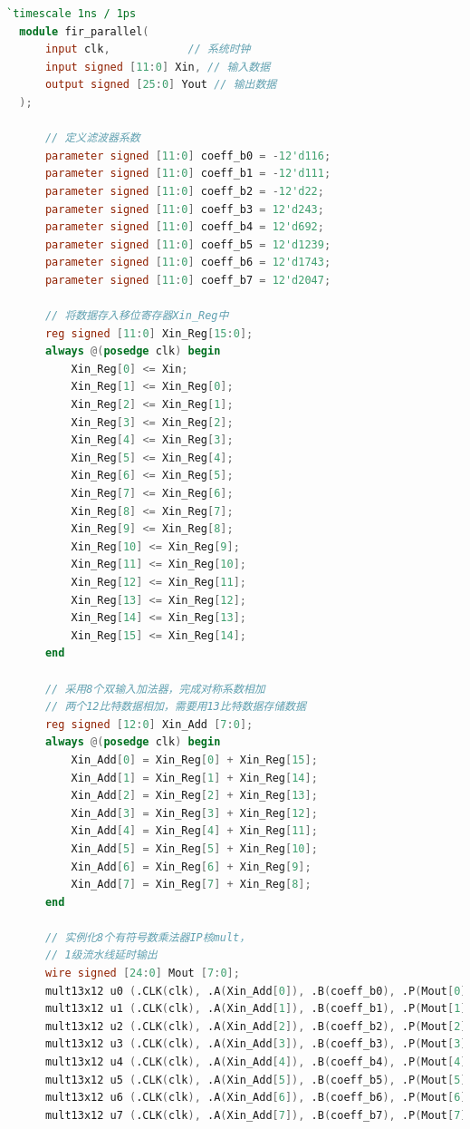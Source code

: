 \begin{remark}
\end{remark}
\begin{lstlisting}[language=verilog,caption={FIR滤波器模块}]
  `timescale 1ns / 1ps
  module fir_parallel( 
      input clk,            // 系统时钟
      input signed [11:0] Xin, // 输入数据
      output signed [25:0] Yout // 输出数据
  );
  
      // 定义滤波器系数
      parameter signed [11:0] coeff_b0 = -12'd116;
      parameter signed [11:0] coeff_b1 = -12'd111;
      parameter signed [11:0] coeff_b2 = -12'd22;
      parameter signed [11:0] coeff_b3 = 12'd243;
      parameter signed [11:0] coeff_b4 = 12'd692;
      parameter signed [11:0] coeff_b5 = 12'd1239;
      parameter signed [11:0] coeff_b6 = 12'd1743;
      parameter signed [11:0] coeff_b7 = 12'd2047;
  
      // 将数据存入移位寄存器Xin_Reg中
      reg signed [11:0] Xin_Reg[15:0];
      always @(posedge clk) begin
          Xin_Reg[0] <= Xin;
          Xin_Reg[1] <= Xin_Reg[0];
          Xin_Reg[2] <= Xin_Reg[1];
          Xin_Reg[3] <= Xin_Reg[2];
          Xin_Reg[4] <= Xin_Reg[3];
          Xin_Reg[5] <= Xin_Reg[4];
          Xin_Reg[6] <= Xin_Reg[5];
          Xin_Reg[7] <= Xin_Reg[6];
          Xin_Reg[8] <= Xin_Reg[7];
          Xin_Reg[9] <= Xin_Reg[8];
          Xin_Reg[10] <= Xin_Reg[9];
          Xin_Reg[11] <= Xin_Reg[10];
          Xin_Reg[12] <= Xin_Reg[11];
          Xin_Reg[13] <= Xin_Reg[12];
          Xin_Reg[14] <= Xin_Reg[13];
          Xin_Reg[15] <= Xin_Reg[14];
      end
  
      // 采用8个双输入加法器，完成对称系数相加
      // 两个12比特数据相加，需要用13比特数据存储数据
      reg signed [12:0] Xin_Add [7:0];
      always @(posedge clk) begin
          Xin_Add[0] = Xin_Reg[0] + Xin_Reg[15];
          Xin_Add[1] = Xin_Reg[1] + Xin_Reg[14];
          Xin_Add[2] = Xin_Reg[2] + Xin_Reg[13];
          Xin_Add[3] = Xin_Reg[3] + Xin_Reg[12];
          Xin_Add[4] = Xin_Reg[4] + Xin_Reg[11];
          Xin_Add[5] = Xin_Reg[5] + Xin_Reg[10];
          Xin_Add[6] = Xin_Reg[6] + Xin_Reg[9];
          Xin_Add[7] = Xin_Reg[7] + Xin_Reg[8];
      end
  
      // 实例化8个有符号数乘法器IP核mult，
      // 1级流水线延时输出
      wire signed [24:0] Mout [7:0];
      mult13x12 u0 (.CLK(clk), .A(Xin_Add[0]), .B(coeff_b0), .P(Mout[0]));
      mult13x12 u1 (.CLK(clk), .A(Xin_Add[1]), .B(coeff_b1), .P(Mout[1]));
      mult13x12 u2 (.CLK(clk), .A(Xin_Add[2]), .B(coeff_b2), .P(Mout[2]));
      mult13x12 u3 (.CLK(clk), .A(Xin_Add[3]), .B(coeff_b3), .P(Mout[3]));
      mult13x12 u4 (.CLK(clk), .A(Xin_Add[4]), .B(coeff_b4), .P(Mout[4]));
      mult13x12 u5 (.CLK(clk), .A(Xin_Add[5]), .B(coeff_b5), .P(Mout[5]));
      mult13x12 u6 (.CLK(clk), .A(Xin_Add[6]), .B(coeff_b6), .P(Mout[6]));
      mult13x12 u7 (.CLK(clk), .A(Xin_Add[7]), .B(coeff_b7), .P(Mout[7]));
  

\end{lstlisting}
